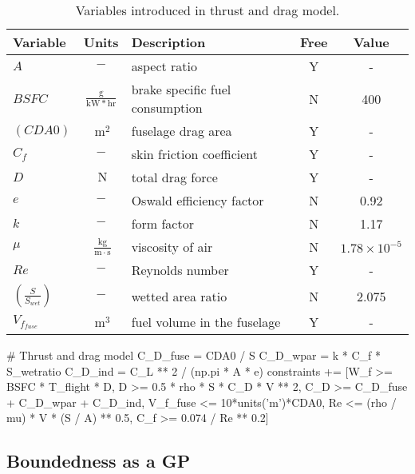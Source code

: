 \begin{footnotesize}
\begin{table}
    \centering
    \begin{tabular}{ l c l c c }
        \toprule
        Variable & Units & Description & Free & Value \\
        \midrule
        $A$ & $-$ & aspect ratio & Y & - \\
        $BSFC$ & $\mathrm{\frac{g}{kW*hr}}$ & brake specific fuel consumption & N & 400 \\
        $(CDA0)$ & $~\mathrm{m^{2}}$ & fuselage drag area & Y & - \\
        $C_f$ & $-$ & skin friction coefficient & Y & - \\
        $D$ & $~\mathrm{N}$ & total drag force & Y & - \\
        $e$ & $-$ & Oswald efficiency factor & N & 0.92 \\
        $k$ & $-$ & form factor & N & 1.17 \\
        $\mu$ & $~\mathrm{\tfrac{kg}{m\cdot s}}$ & viscosity of air & N &
            $\mathrm{1.78 \times 10^{-5}}$ \\
        $Re$ & $-$ & Reynolds number & Y & - \\
        $(\frac{S}{S_{wet}})$ & $-$ & wetted area ratio & N & 2.075 \\
        $V_{f_{fuse}}$ & $~\mathrm{m^{3}}$ & fuel volume in the fuselage & Y & - \\
        \bottomrule
    \end{tabular}
    \caption{Variables introduced in thrust and drag model.}
    \label{tab:vars_TandD}
\end{table} \end{footnotesize}

\begin{python}
        # Thrust and drag model
        C_D_fuse = CDA0 / S
        C_D_wpar = k * C_f * S_wetratio
        C_D_ind  = C_L ** 2 / (np.pi * A * e)
        constraints += [W_f >= BSFC * T_flight * D,
                    D >= 0.5 * rho * S * C_D * V ** 2,
                    C_D >= C_D_fuse + C_D_wpar + C_D_ind,
                    V_f_fuse <= 10*units('m')*CDA0,
                    Re <= (rho / mu) * V * (S / A) ** 0.5,
                    C_f >= 0.074 / Re ** 0.2]
\end{python}

\subsection{Boundedness as a GP}

